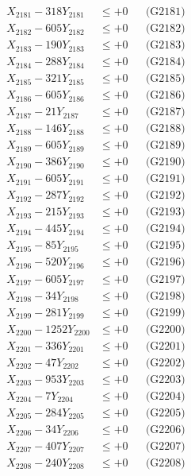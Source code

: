 \documentclass[a4paper,10pt]{article}
\begin{document}
{\begin{align}
\allowbreak
X_{2181} - 318Y_{2181} &\leq +0 && \text{(G2181)} \\
X_{2182} - 605Y_{2182} &\leq +0 && \text{(G2182)} \\
X_{2183} - 190Y_{2183} &\leq +0 && \text{(G2183)} \\
X_{2184} - 288Y_{2184} &\leq +0 && \text{(G2184)} \\
X_{2185} - 321Y_{2185} &\leq +0 && \text{(G2185)} \\
X_{2186} - 605Y_{2186} &\leq +0 && \text{(G2186)} \\
X_{2187} - 21Y_{2187} &\leq +0 && \text{(G2187)} \\
X_{2188} - 146Y_{2188} &\leq +0 && \text{(G2188)} \\
X_{2189} - 605Y_{2189} &\leq +0 && \text{(G2189)} \\
X_{2190} - 386Y_{2190} &\leq +0 && \text{(G2190)} \\
\allowbreak
X_{2191} - 605Y_{2191} &\leq +0 && \text{(G2191)} \\
X_{2192} - 287Y_{2192} &\leq +0 && \text{(G2192)} \\
X_{2193} - 215Y_{2193} &\leq +0 && \text{(G2193)} \\
X_{2194} - 445Y_{2194} &\leq +0 && \text{(G2194)} \\
X_{2195} - 85Y_{2195} &\leq +0 && \text{(G2195)} \\
X_{2196} - 520Y_{2196} &\leq +0 && \text{(G2196)} \\
X_{2197} - 605Y_{2197} &\leq +0 && \text{(G2197)} \\
X_{2198} - 34Y_{2198} &\leq +0 && \text{(G2198)} \\
X_{2199} - 281Y_{2199} &\leq +0 && \text{(G2199)} \\
X_{2200} - 1252Y_{2200} &\leq +0 && \text{(G2200)} \\
\allowbreak
X_{2201} - 336Y_{2201} &\leq +0 && \text{(G2201)} \\
X_{2202} - 47Y_{2202} &\leq +0 && \text{(G2202)} \\
X_{2203} - 953Y_{2203} &\leq +0 && \text{(G2203)} \\
X_{2204} - 7Y_{2204} &\leq +0 && \text{(G2204)} \\
X_{2205} - 284Y_{2205} &\leq +0 && \text{(G2205)} \\
X_{2206} - 34Y_{2206} &\leq +0 && \text{(G2206)} \\
X_{2207} - 407Y_{2207} &\leq +0 && \text{(G2207)} \\
X_{2208} - 240Y_{2208} &\leq +0 && \text{(G2208)} \\

\end{align}}
\end{document}
